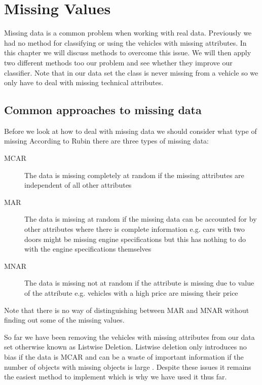 \chapter{Missing Values}

Missing data is a common problem when working with real data.
Previously we had no method for classifying or using the vehicles with missing attributes.
In this chapter we will discuss methods to overcome this issue.
We will then apply two different methods too our problem and see whether they improve our classifier.
Note that in our data set the class is never missing from a vehicle so we only have to deal with missing technical attributes.

\section{Common approaches to missing data}

Before we look at how to deal with missing data we should consider what type of missing According to Rubin \cite{Rubin76} there are three types of missing data:
\begin{description}
	\item[MCAR] The data is missing completely at random if the missing attributes are independent of all other  attributes
	\item[MAR] The data is missing at random if the missing data can be accounted for by other attributes where there is complete information e.g. cars with two doors might be missing engine specifications but this has nothing to do with the engine specifications themselves
	\item[MNAR] The data is missing not at random if the attribute is missing due to value of the attribute e.g. vehicles with a high price are missing their price
\end{description}
Note that there is no way of distinguishing between MAR and MNAR without finding out some of the missing values.

So far we have been removing the vehicles with missing attributes from our data set otherwise known as Listwise Deletion.
Listwise deletion only introduces no bias if the data is MCAR \cite{Allison02} and can be a waste of important information if the number of objects with missing objects is large \cite{Little92}.
Despite these issues it remains the easiest method to implement which is why we have used it thus far.

